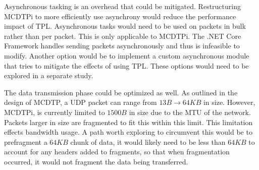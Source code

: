 Asynchronous tasking is an overhead that could be mitigated. Restructuring MCDTPi to more efficiently use asynchrony would reduce the performance impact of TPL. Asynchronous tasks would need to be used on packets in bulk rather than per packet. This is only applicable to MCDTPi. The .NET Core Framework handles sending packets asynchronously and thus is infeasible to modify. Another option would be to implement a custom asynchronous module that tries to mitigate the effects of using TPL. These options would need to be explored in a separate study.

The data transmission phase could be optimized as well. As outlined in the design of MCDTP, a UDP packet can range from $13B \rightarrow 64KB$ in size. However, MCDTPi, is currently limited to $1500B$ in size due to the MTU of the network. Packets larger in size are fragmented to fit this within this limit. This limitation effects bandwidth usage. A path worth exploring to circumvent this would be to prefragment a $64KB$ chunk of data, it would likely need to be less than $64KB$ to account for any headers added to fragments, so that when fragmentation occurred, it would not fragment the data being transferred.
